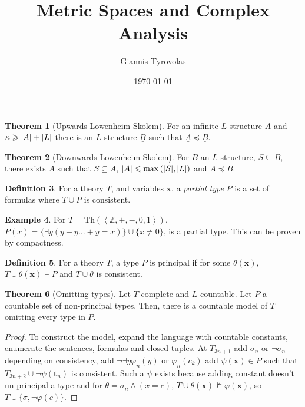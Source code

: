 \documentclass[a4paper,10pt]{article}
\title{Metric Spaces and Complex Analysis}
\author{Giannis Tyrovolas}
\date{\today}
\theoremstyle{definition}
\newtheorem{theorem}{Theorem}
\DeclarePairedDelimiter\abs{\lvert}{\rvert}
\newtheorem{definition}[theorem]{Definition}
\newtheorem{example}[theorem]{Example}
\let\vec\mathbf
\let\phi\varphi
\let\preceq\preccurlyeq
\let\leq\leqslant
\let\geq\geqslant
\begin{document}
\begin{theorem}[Upwards Lowenheim-Skolem] For an infinite $L$-structure $\underline{A}$ and $\kappa \geq \abs{A} + \abs{L}$ there is an $L$-structure $\underline{B}$ such that $\underline{A} \preceq \underline{B}$.
\end{theorem}

\begin{theorem}[Downwards Lowenheim-Skolem]
    For $\underline{B}$ an $L$-structure, $S \subseteq B$, there exists $\underline{A}$ such that $S \subseteq A$, $\abs{A} \leq \max{(\abs{S}, \abs{L})}$ and $\underline{A} \preceq \underline{B}$.

\end{theorem}

\begin{definition}
    For a theory $T$, and variables $\vec{x}$, a \emph{partial type} $P$ is a set of formulas where $T \cup P$ is consistent.
\end{definition}

\begin{example}
    For $T = \text{Th}(\left\langle \mathbb{Z}, +, -, 0, 1\right\rangle )$, $P(x) = \{\exists y(y + y \ldots +y = x)\} \cup \{x \neq 0\}$, is a partial type. This can be proven by compactness.
\end{example}

\begin{definition}
    For a theory $T$, a type $P$ is principal if for some $\theta(\vec{x})$, $T\cup \theta(\vec{x}) \models P$ and $T \cup \theta$ is consistent.
\end{definition} 

\begin{theorem}[Omitting types]
    Let $T$ complete and $L$ countable. Let $P$ a countable set of non-principal types.
    Then, there is a countable model of $T$ omitting every type in $P$.
\end{theorem}
\begin{proof}
    To construct the model, expand the language with countable constants, enumerate the sentences, formulas and closed tuples. At $T_{3n+1}$ add $\sigma_n$ or $\neg \sigma_n$ depending on consistency, add $\neg \exists y \phi_n(y)$ or $\phi_n(c_k)$ add $\psi(\vec{x}) \in P$ such that $T_{3n+2} \cup \neg \psi(\vec{t}_n)$ is consistent. Such a $\psi$ exists because adding constant doesn't un-principal a type and for $\theta = \sigma_n \land (x = c)$, $T \cup \theta(\vec{x}) \nvDash  \phi(\vec{x})$, so $T \cup \{\sigma, \neg \phi(c)\} $.
\end{proof}
\end{document}
